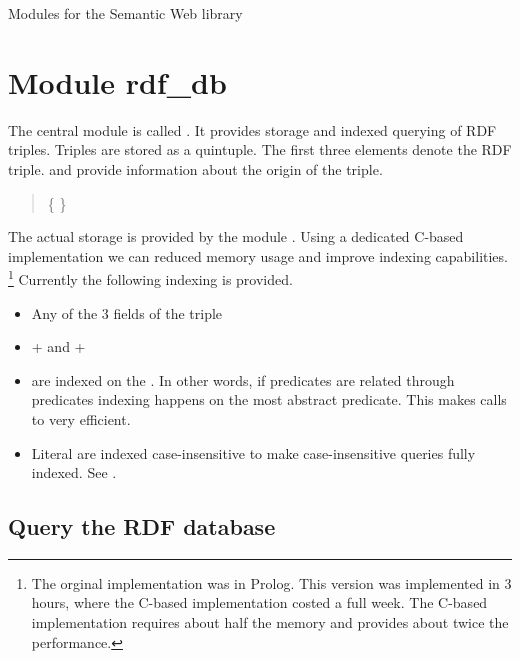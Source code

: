 \documentclass[11pt]{article}
\begin{document}
	{Modules for the Semantic Web library}




\section{Module rdf_db}

The central module is called .  It provides storage and
indexed querying of RDF triples.  Triples are stored as a quintuple.
The first three elements denote the RDF triple.  and
 provide information about the origin of the triple.

\begin{quote}
\{    \}
\end{quote}

The actual storage is provided by the 
module .  Using a dedicated C-based implementation we
can reduced memory usage and improve indexing capabilities.%
	\footnote{The orginal implementation was in Prolog.  This
		  version was implemented in 3 hours, where the C-based
		  implementation costed a full week.  The C-based
		  implementation requires about half the memory and
		  provides about twice the performance.}
Currently the following indexing is provided.

\begin{itemize}
    \item Any of the 3 fields of the triple
    \item {} +  and  + 
    \item {} are indexed on the .  In
          other words, if predicates are related through
	   predicates indexing happens on the most
	  abstract predicate. This makes calls to  very
	  efficient.
    \item Literal  are indexed case-insensitive to make
          case-insensitive queries fully indexed.  See .
\end{itemize}

\subsection{Query the RDF database}
\end{document}
